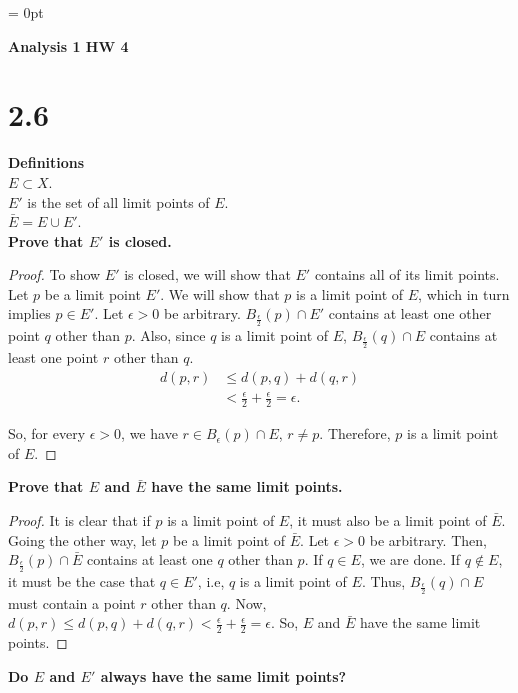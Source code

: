 \documentclass[12pt]{article}
\begin{document}


\setcounter{section}{0} %
\renewcommand{\thesection}{}


\parindent = 0pt


      {\bf Analysis 1 HW 4}

\section{2.6}
{\bf Definitions}\\
$E\subset X$. \\
$E'$ is the set of all limit points of $E$.\\
$\bar{E}=E\cup E'$.\\

{\bf Prove that $E'$ is closed.}
\begin{proof}
To show $E'$ is closed, we will show that $E'$ contains all of its 
limit points. Let $p$ be a limit point $E'$. We will show that $p$ 
is a limit point of $E$, which in turn implies $p\in E'$. Let $\epsilon>0$ 
be arbitrary. $B_{\frac{\epsilon}{2}}(p)\cap E'$ contains at least one 
other point $q$ other than $p$. Also, since $q$ is a limit point of $E$, 
$B_{\frac{\epsilon}{2}}(q)\cap E$ contains at least one point $r$ other 
than $q$. 
\begin{align*}
      d(p, r) & \le d(p, q)+d(q, r) \\
       & < \frac{\epsilon}{2} + \frac{\epsilon}{2}=\epsilon.
\end{align*}
      
So, for every $\epsilon>0$, we have $r\in B_{\epsilon}(p)\cap E$, $r\ne p$. 
Therefore, $p$ is a limit point of $E$.
\end{proof}

{\bf Prove that $E$ and $\bar{E}$ have the same limit points.}
\begin{proof}
It is clear that if $p$ is a limit point of $E$, it must also be a limit 
point of $\bar{E}$. Going the other way, let $p$ be a limit point of 
$\bar{E}$. Let $\epsilon>0$ be arbitrary. Then, 
$B_{\frac{\epsilon}{2}}(p)\cap \bar{E}$ contains at least one $q$ other 
than $p$. If $q\in E$, we are done. If $q\not\in E$, it must be the case 
that $q\in E'$, i.e, $q$ is a limit point of $E$. Thus, 
$B_{\frac{\epsilon}{2}}(q)\cap E$ must contain a point $r$ other than 
$q$. Now, $d(p, r)\le d(p, q)+d(q, r)< \frac{\epsilon}{2} +
\frac{\epsilon}{2}=\epsilon$. So, $E$ and $\bar{E}$ have the same limit 
points.
\end{proof}
{\bf Do $E$ and $E'$ always have the same limit points?}
\end{document}
